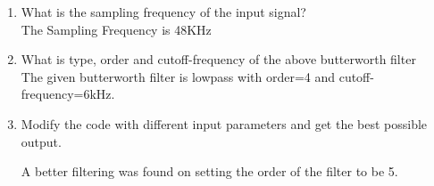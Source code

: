 \documentclass[journal,12pt,twocolumn]{IEEEtran}
\theoremstyle{remark}
\begin{document}
\begin{enumerate}[label=\thesection.\arabic*]
\item What is the sampling frequency of the input signal?\\
\solution The Sampling Frequency is 48KHz
\item
What is type, order and  cutoff-frequency of the above butterworth filter
\\
\solution The given butterworth filter is lowpass with order=4 and cutoff-frequency=6kHz.

\item
Modify the code with different input parameters and get the best possible output.

\solution
A better filtering was found on setting the order of the filter to be 5.


\end{enumerate}
\end{document}
